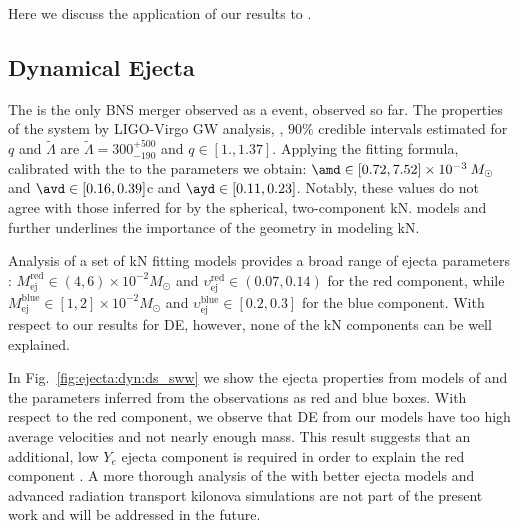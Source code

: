 
Here we discuss the application of our results to \GW{}.


\subsection{Dynamical Ejecta}

The \GW{} is the only \ac{BNS} merger observed as a \mm{} event, observed so far.
%
%
The properties of the system by LIGO-Virgo \ac{GW} analysis, 
\citep{TheLIGOScientific:2017qsa,Abbott:2018wiz,De:2018uhw,Abbott:2018exr} \ie, 
$90\%$ credible intervals estimated for $q$ and $\tilde{\Lambda}$ 
are
$\tilde{\Lambda}=300_{-190}^{+500}$ and $q\in[1., 1.37]$. 
Applying the \polql{} fitting formula, calibrated with the \DSrefset{} to the 
\GW{} parameters we obtain:
%
$\amd \in [0.72, 7.52] \times 10^{-3}\: M_{\odot}$
and
$\avd \in [0.16, 0.39]$c 
and 
$\ayd \in [0.11, 0.23]$.
%
Notably, these values do not agree with those inferred for \AT{} by the spherical, 
two-component \ac{kN}. models \citep{Villar:2017wcc} and further underlines the 
importance of the geometry in modeling \ac{kN}.


Analysis of a set of \ac{kN} fitting models provides a broad range of ejecta 
parameters \citep{Siegel:2019mlp}:
%
$M_{\text{ej}}^{\text{red}}\in(4, 6)\times10^{-2}M_{\odot}$ and
$\upsilon_{\text{ej}}^{\text{red}}\in(0.07, 0.14)$ for the red component, while
$M_{\text{ej}}^{\text{blue}}\in[1, 2]\times10^{-2}M_{\odot}$ and 
$\upsilon_{\text{ej}}^{\text{blue}}\in[0.2, 0.3]$ for the blue component.
%
With respect to our results for \ac{DE}, however, 
none of the \ac{kN} components can be well explained.

In Fig.~\ref{fig:ejecta:dyn:ds_sww} we show the ejecta properties from
models of \DSrefset{} and the parameters inferred from the
observations as red and blue boxes. 
%
With respect to the red component, we observe that \ac{DE} from our models 
have too high average velocities and not nearly enough mass.
This result suggests that an additional, low $Y_e$ ejecta component is required
in order to explain the \AT{} red component 
\citep{Perego:2017wtu,Kawaguchi:2018ptg,Nedora:2019jhl}.
%
A more thorough analysis of the \AT{} with better ejecta models and advanced
radiation transport kilonova simulations are not part of the present work 
and will be addressed in the future.



